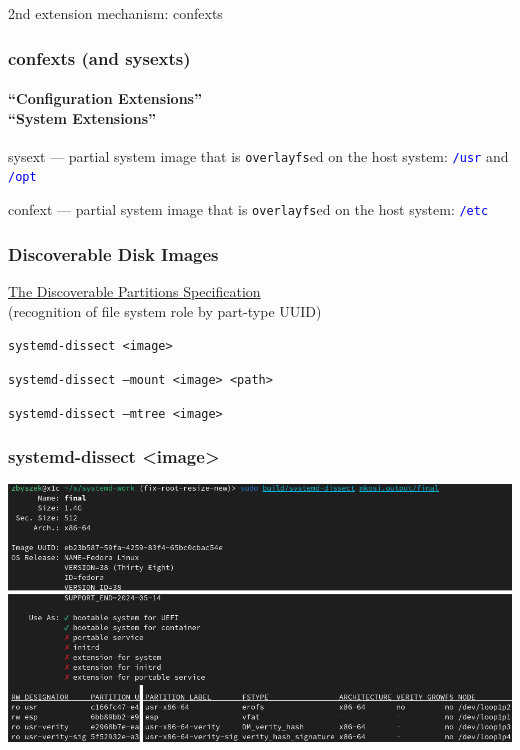 \documentclass[]{beamer}
\newcommand\pp\pause
\begin{document}
\begin{frame}
  2nd extension mechanism: confexts
\end{frame}

\begin{frame}
  \frametitle{confexts (and sysexts)}
  \framesubtitle{``Configuration Extensions''\\
                 ``System Extensions''}

  sysext — partial system image that is \texttt{overlayfs}ed on the host system:
  \textcolor{blue}{\texttt{/usr}} and \textcolor{blue}{\texttt{/opt}}
  \\\quad\pp

  confext — partial system image that is \texttt{overlayfs}ed on the host system:
  \textcolor{blue}{\texttt{/etc}}


\end{frame}

\begin{frame}
  \frametitle{Discoverable Disk Images}

  \href{https://uapi-group.org/specifications/specs/discoverable_partitions_specification/}{The Discoverable Partitions Specification}\\
  (recognition of file system role by part-type UUID)
  \\\quad\pp

  \texttt{systemd-dissect <image>}
  \\\quad\pp

  \texttt{systemd-dissect --mount <image> <path>}
  \\\quad\pp

  \texttt{systemd-dissect --mtree <image>}
\end{frame}

\begin{frame}
  \frametitle{systemd-dissect <image>}

  \hspace*{-2em}\includegraphics[width=1.15\textwidth]{images/systemd-dissect.png}
\end{frame}
\end{document}

